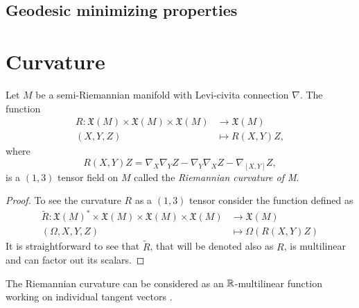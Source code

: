 \subsection{Geodesic minimizing properties}

\section{Curvature}

\begin{lemma}
	Let $M$ be a semi-Riemannian manifold with Levi-civita connection $\nabla$. The function
	\begin{align*}
		R \colon \mathfrak{X}(M) \times \mathfrak{X}(M) \times \mathfrak{X}(M) &\to \mathfrak{X}(M) \\
		(X, Y, Z) &\mapsto R(X,Y)Z,
	\end{align*}
	where
	\[
		R(X,Y)Z = \nabla_X \nabla_Y Z - \nabla_Y \nabla_X Z - \nabla_{[X,Y]} Z,
	\]
	is a $(1,3)$ tensor field on $M$ called the \emph{Riemannian curvature of M}.
\end{lemma}

\begin{proof}
	To see the curvature $R$ as a $(1,3)$ tensor consider the function defined as
		\begin{align*}
		\tilde{R} \colon \mathfrak{X}(M)^* \times \mathfrak{X}(M) \times \mathfrak{X}(M) \times \mathfrak{X}(M) &\to \mathfrak{X}(M) \\
		(\Omega, X, Y, Z) &\mapsto \Omega\left(R(X,Y)Z\right)
	\end{align*}
	It is straightforward to see that $\tilde{R}$, that will be denoted also as $R$, is multilinear and can factor out its scalars.
\end{proof}

The Riemannian curvature can be considered as an $\mathbb{R}$-multilinear function working on individual tangent vectors .
